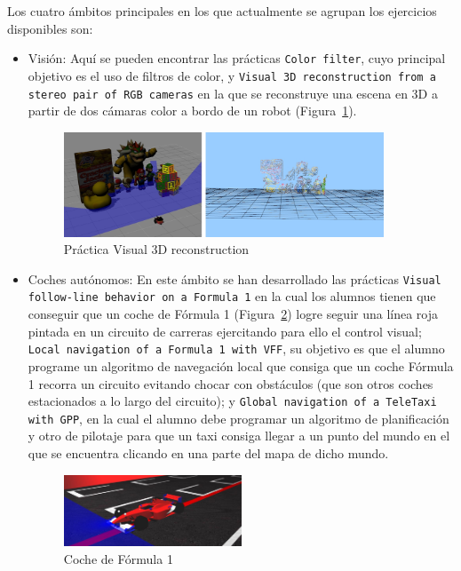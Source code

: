 Los cuatro ámbitos principales en los que actualmente se agrupan los ejercicios disponibles son:

\begin{itemize}
	\item Visión: Aquí se pueden encontrar las prácticas \texttt{Color filter}, cuyo principal objetivo es el uso de filtros de color, y \texttt{Visual 3D reconstruction from a stereo pair of RGB cameras} en la que se reconstruye una escena en 3D a partir de dos cámaras color a bordo de un robot (Figura~\ref{fig.vision}).
	\begin{figure}[H]
  	\begin{center}
    	\includegraphics[width=0.9\textwidth]{figures/Introduccion/vision.jpg}
			\caption{Práctica Visual 3D reconstruction}
			\label{fig.vision}
			\end{center}
	\end{figure}

	\item Coches autónomos: En este ámbito se han desarrollado las prácticas \texttt{Visual follow-line behavior on a Formula 1} en la cual los alumnos tienen que conseguir que un coche de Fórmula 1 (Figura~\ref{fig.f1}) logre seguir una línea roja pintada en un circuito de carreras ejercitando para ello el control visual; \texttt{Local navigation of a Formula 1 with VFF}, su objetivo es que el alumno programe un algoritmo de navegación local que consiga que un coche Fórmula 1 recorra un circuito evitando chocar con obstáculos (que son otros coches estacionados a lo largo del circuito); y \texttt{Global navigation of a TeleTaxi with GPP}, en la cual el alumno debe programar un algoritmo de planificación y otro de pilotaje para que un taxi consiga llegar a un punto del mundo en el que se encuentra clicando en una parte del mapa de dicho mundo.
	\begin{figure}[H]
  	\begin{center}
    	\includegraphics[width=0.5\textwidth]{figures/Introduccion/f1.jpg}
			\caption{Coche de Fórmula 1}
			\label{fig.f1}
			\end{center}
	\end{figure}


\end{itemize}
